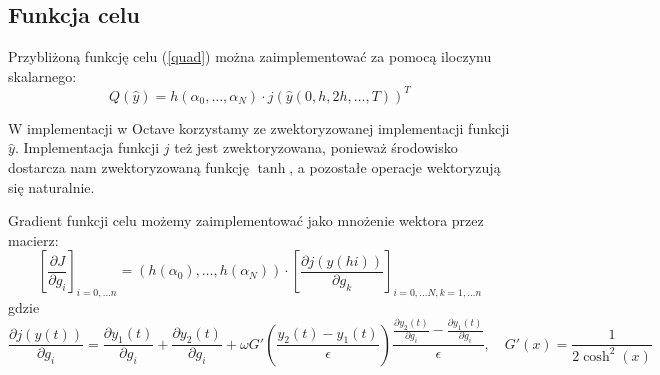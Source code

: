 \documentclass[11pt]{article}
\begin{document}
\subsection{Funkcja celu}
Przybliżoną funkcję celu (\ref{quad}) można zaimplementować za pomocą iloczynu skalarnego:
\begin{equation}
  Q(\hat{y}) = h(\alpha_0,\ldots,\alpha_N) \cdot {j(\hat{y}(0, h, 2h, \ldots, T))}^T
\end{equation}

W implementacji w Octave korzystamy ze zwektoryzowanej implementacji funkcji $\hat{y}$. Implementacja funkcji $j$ też jest zwektoryzowana, ponieważ środowisko dostarcza nam zwektoryzowaną funkcję $\tanh$, a pozostałe operacje wektoryzują się naturalnie.

Gradient funkcji celu możemy zaimplementować jako mnożenie wektora przez macierz:
\begin{equation}
  {\left[\frac{\partial J}{\partial g_i}\right]}_{i = 0, \ldots n} = \left(h(\alpha_0),\ldots,h(\alpha_N)\right) \cdot {\left[\frac{\partial j(\hat{y}(hi))}{\partial g_k}\right]}_{i = 0, \ldots N, k = 1, \ldots n}
\end{equation}
gdzie
\begin{equation}
  \frac{\partial j(y(t))}{\partial g_i} = \frac{\partial y_1(t)}{\partial g_i} + \frac{\partial y_2(t)}{\partial g_i} + \omega G'\left(\frac{y_2(t) - y_1(t)}{\epsilon}\right)\frac{\frac{\partial y_2(t)}{\partial g_i} - \frac{\partial y_1(t)}{\partial g_i}}{\epsilon},\quad G'(x) = \frac{1}{2\cosh^2(x)}
\end{equation}
\end{document}
